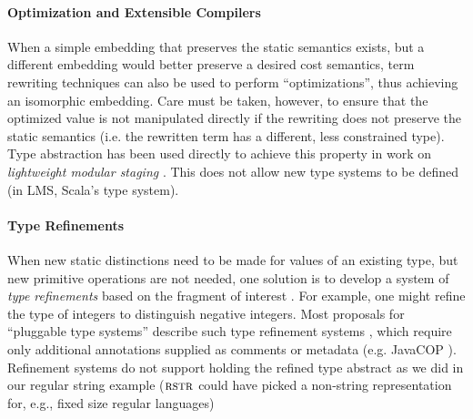 \documentclass[10pt,preprint]{sigplanconf}
\begin{document}

\paragraph{Optimization and Extensible Compilers}
When a simple embedding that preserves the static semantics exists, but a different  embedding would better preserve a desired cost semantics, term rewriting techniques can also be used to perform ``optimizations'', thus achieving an isomorphic embedding. Care must be taken, however, to ensure that the optimized value is not manipulated directly if the rewriting does not preserve the static semantics (i.e. the rewritten term has a different, less constrained type). Type abstraction has been used directly to achieve this property in work on \emph{lightweight modular staging} \cite{Rompf:2012:LMS}. This does not allow new type systems to be defined (in LMS, Scala's type system). %

\paragraph{Type Refinements}
When new static distinctions need to be made for values of an existing type, but new primitive operations are not needed, one solution is to develop a system of \emph{type refinements} based on the fragment of interest \cite{Freeman91}. For example, one might refine the type of integers to distinguish negative integers. Most proposals for ``pluggable type systems'' describe such type refinement systems \cite{Brac04a}, which require only additional annotations supplied as comments or metadata (e.g. JavaCOP \cite{Andreae:2006:FIP:1167473.1167479}). Refinement systems do not support holding the refined type abstract as we did in our regular string example ($\textsc{rstr}$ could have picked a non-string representation for, e.g., fixed size regular languages)%
\end{document}
